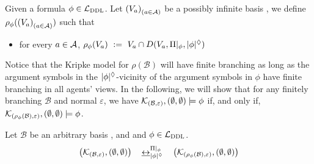 \documentclass{llncs}
\newcommand{\shrink}[2]{\rho_{#1}(#2)}
\newcommand{\dlangm}{{\mathcal L}_{\acro{DDL}}}
\newcommand{\kmod}[2]{{\cal K}_{(#1,#2)}}
\newcommand{\basis}{basis }
\newcommand{\views}{\mathcal B}
\newcommand{\viewsv}{\left(V_a\right)_{(a \in \agents)}}
\newcommand{\sem}{\varepsilon}
\newcommand{\depth}[1]{|{#1}|^\adia}
\newcommand{\bisim}{\underline{\leftrightarrow}}
\begin{document}
\begin{definition}\label{def:shrink} Given a formula $\phi \in \dlangm$. Let $\viewsv$ be a possibly infinite \basis, we define $\shrink \phi \viewsv$ such that
\begin{itemize}
\item for every $a \in \mathcal A$, $\shrink \phi {V_a} ~:=~ V_a \cap D(V_a, \restr \Pi \phi, \depth{\phi})$
\end{itemize}
\end{definition}

Notice that the Kripke model for $\rho(\views)$ will have finite branching as long as the argument symbols in the $\depth{\phi}$-vicinity of the argument symbols in $\phi$ have finite branching in all agents' views. In the following, we
 will show that for any finitely branching $\views$ and normal $\sem$, we have $\kmod \views \sem, (\emptyset,\emptyset) \models \phi$ if, and only if, $\kmod {\shrink \phi \views} \sem, (\emptyset,\emptyset) \models \phi$. 

\begin{theorem} Let $\views$ be an arbitrary \basis, and and $\phi \in \dlangm$. 
$$ \left(\kmod \views \sem, (\emptyset,\emptyset)\right) \quad   \bisim_{\depth{\phi}}^{\restr \Pi \phi}  \quad \left(\kmod {\shrink \phi \views} \sem, (\emptyset,\emptyset)\right)$$
\end{theorem}

\end{document}
